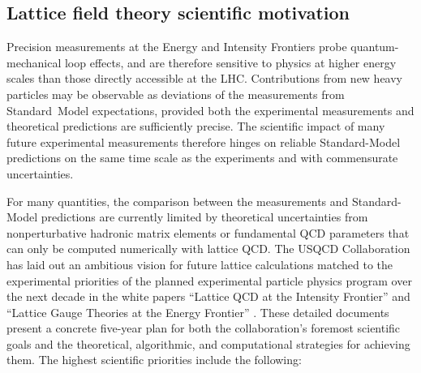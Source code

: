 \subsection{Lattice field theory scientific motivation}

Precision measurements at the Energy and Intensity Frontiers probe
quantum-mechanical loop effects, and are therefore sensitive to physics at
higher energy scales than those directly accessible at the LHC.  Contributions
from new heavy particles may be observable as deviations of the measurements
from Standard~Model expectations, provided both the experimental measurements
and theoretical predictions are sufficiently precise.  The scientific impact
of many future experimental measurements therefore hinges on reliable
Standard-Model predictions on the same time scale as the experiments and with
commensurate uncertainties.

For many quantities, the comparison between the measurements and
Standard-Model predictions are currently limited by theoretical uncertainties
from nonperturbative hadronic matrix elements or fundamental QCD parameters
that can only be computed numerically with lattice QCD.  The USQCD
Collaboration has laid out an ambitious vision for future lattice calculations
matched to the experimental priorities of the planned experimental particle
physics program over the next decade in the white papers ``Lattice QCD at the
Intensity Frontier'' and ``Lattice Gauge Theories at the Energy Frontier''
\cite{USQCD_IF_whitepaper13,USQCD_EF_whitepaper13}.  These detailed documents
present a concrete five-year plan for both the collaboration's foremost
scientific goals and the theoretical, algorithmic, and computational
strategies for achieving them.  The highest scientific priorities include
the following:

